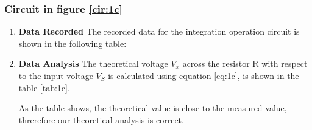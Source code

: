     \subsubsection{Circuit in figure \ref{cir:1c}}
        \begin{enumerate}[I]
            \item \textbf{Data Recorded}\newline
                The recorded data for the integration operation circuit is shown in the following table:
                \addtolength{\leftskip}{-2cm}
                \addtolength{\rightskip}{-2cm}
                \begin{table}[H]
                    \addtolength{\leftskip}{-2cm}
                    \addtolength{\rightskip}{-2cm}
                    \centering
                    \caption{Recorded Data for Circuit \ref{cir:1c}(Unit: V)}
                    \label{tab:1c}
                \end{table}
            \item \textbf{Data Analysis}\newline
                The theoretical voltage $V_x$ across the resistor R with respect to the input voltage $V_S$ is calculated using equation \ref{eq:1c}, is shown in the table \ref{tab:1c}.\par
                
                As the table shows, the theoretical value is close to the measured value, threrefore our theoretical analysis is correct.
        \end{enumerate}

